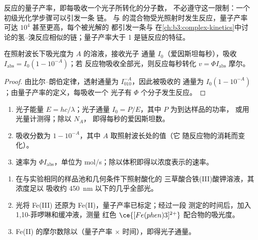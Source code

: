 反应的量子产率，即每吸收一个光子所转化的分子数，
不必遵守这一限制：一个初级光化学步骤可以引发一条
链。 与  的混合物受光照射时发生反应，量子产率
可达 $10^4$ 甚至更高，每个被光解的  都引发一条与
在\cref{ch:b3:complex-kinetics}中讨论的氢–溴反应相似的链；量子产率大于 1
是链反应的特征。

\begin{proposition}[光化学反应的速率]\label{prop:b3:photochemistry:rate}
在照射波长下吸光度为 $A$ 的溶液，接收光子
通量 $I_0$（爱因斯坦每秒），吸收 $I_{\mathrm{abs}} = I_0(1 - 10^{-A})$；若
反应物吸收全部光，则反应每秒转化 $v = \Phi I_{\mathrm{abs}}$ 摩尔。
\end{proposition}

\begin{proof}
由比尔–朗伯定律，透射通量为 $I_010^{-A}$，因此被吸收的
通量为 $I_0(1 - 10^{-A})$；由量子产率的定义，每吸收一个
光子有 $\Phi$ 个分子发生反应。
\end{proof}

\begin{method}[由光源确定光化学反应的速率]\label{met:b3:photochemistry:photochemical-rate}
\begin{enumerate}
  \item 光子能量 $E = hc/\lambda$；光子通量 $I_0 = P/E$，其中 $P$ 为到达样品的功率，
        或用光量计测得；除以 $N_A$，
        即得每秒的爱因斯坦数。
  \item 吸收分数为 $1 - 10^{-A}$，其中 $A$ 取照射波长处的值（它
        随反应物的消耗而变化）。
  \item 速率为 $\Phi I_{\mathrm{abs}}$，单位为 mol/s；除以体积即得以浓度表示的速率。
\end{enumerate}
\end{method}

\begin{method}[草酸铁光量测定法]\label{met:b3:photochemistry:actinometry}
\begin{enumerate}
  \item 在与实验相同的样品池和几何条件下照射酸化的
        三草酸合铁(III)酸钾溶液，其浓度足以
        吸收约 \qty{450}{nm} 以下的几乎全部光。
  \item 光将 Fe(III) 还原为 Fe(II)，量子产率已标定；经过一段
        测定的时间后，加入 1,10-菲啰啉和缓冲液，测量
        红色 $\ce{[Fe(phen)3]^{2+}}$ 配合物的吸光度。
  \item Fe(II) 的摩尔数除以（量子产率 $\times$ 时间），即得光子通量。
\end{enumerate}
\end{method}

